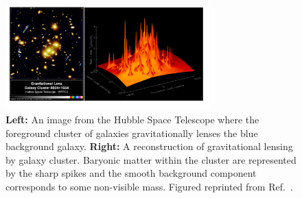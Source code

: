 \fi
\begin{figure}[t!]
	\centering
	\includegraphics[width=0.7\textwidth]{figures/DMOverview/Strong_Grav_lens.png}
	\caption[\textbf{Left:} Effects of gravitational lensing on multiple galaxies. \textbf{Right:} Reconstruction of gravitational lensing effects.]{\textbf{Left:} An image from the Hubble Space Telescope where the foreground cluster of galaxies gravitationally lenses the blue background galaxy. \textbf{Right:} A reconstruction of gravitational lensing by galaxy cluster. Baryonic matter within the cluster are represented by the sharp spikes and the smooth background component corresponds to some non-visible mass. Figured reprinted from Ref.~\cite{Freese2009}.}
	\label{fig:DMOverview/StrongGravLens}
\end{figure}
